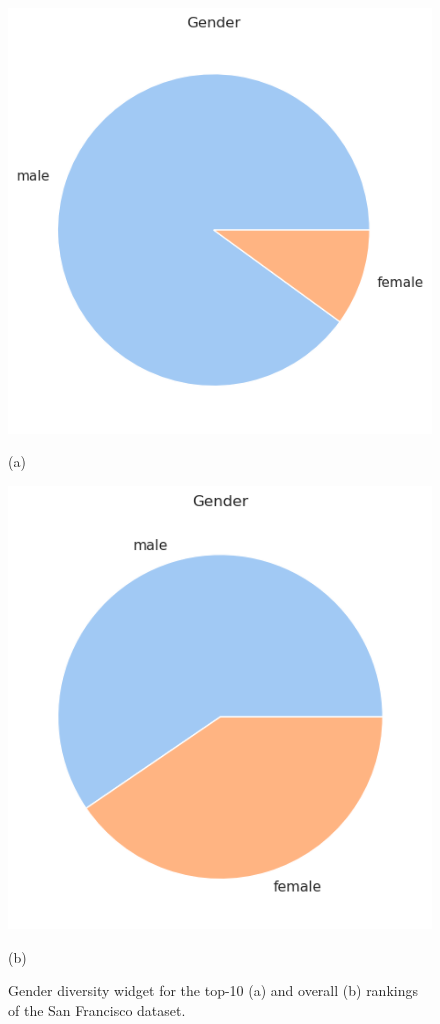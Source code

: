 \begin{itemize}
\begin{figure}[t!]
\centering
\begin{minipage}{0.45\textwidth}
\centering
\includegraphics[width=\textwidth]{figures/san_francisco_rankingfacts3a.png}
\caption*{(a)}
\end{minipage}
\begin{minipage}{0.45\textwidth}
\centering
\includegraphics[width=\textwidth]{figures/san_francisco_rankingfacts3b.png}
\caption*{(b)}
\end{minipage}
\caption{\textrm{Gender} diversity widget for the top-10 (a) and overall (b) rankings of the San Francisco dataset.}
\label{fig:san_francisco_rankingfacts3}
\end{figure}

\end{itemize}


